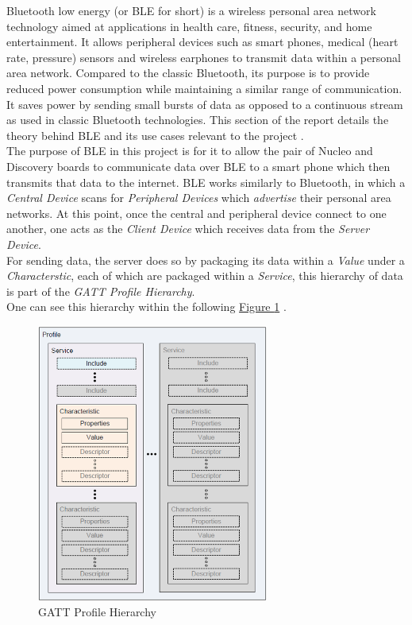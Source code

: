 Bluetooth low energy (or BLE for short) is a wireless personal area network technology aimed at applications in health care, fitness, security, and home entertainment. 
It allows peripheral devices such as smart phones, medical (heart rate, pressure) sensors and wireless earphones to transmit data within a personal area network. 
Compared to the classic Bluetooth, its purpose is to provide reduced power consumption while maintaining a similar range of communication. 
It saves power by sending small bursts of data as opposed to a continuous stream as used in classic Bluetooth technologies. 
This section of the report details the theory behind BLE and its use cases relevant to the project \cite{gatt}.\\

The purpose of BLE in this project is for it to allow the pair of Nucleo and Discovery boards to communicate data over BLE to a smart phone which then transmits that data to the internet. 
BLE works similarly to Bluetooth, in which a \textit{Central Device} scans for \textit{Peripheral Devices} which \textit{advertise} their personal area networks. 
At this point, once the central and peripheral device connect to one another, one acts as the \textit{Client Device} which receives data from the \textit{Server Device}.\\

For sending data, the server does so by packaging its data within a \textit{Value} under a \textit{Characterstic}, each of which are packaged within a \textit{Service}, this hierarchy of data is part of the \textit{GATT Profile Hierarchy}.\\
One can see this hierarchy within the following \hyperref[fig:uiscreenshot]{Figure \ref{fig:gatt}} \cite{gatt}.\\
\begin{figure}[h]
	\begin{center}
		\includegraphics[width=3in]{GATT_Profile_Hierarchy.png}
	\end{center}
	\caption{GATT Profile Hierarchy}\label{fig:gatt}
\end{figure}

